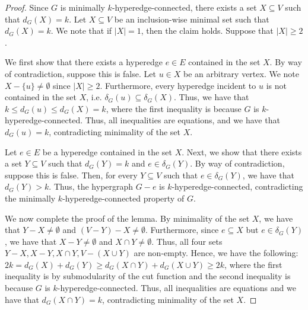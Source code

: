 \begin{proof}
    Since $G$ is minimally $k$-hyperedge-connected, there exists a set $X \subseteq V$ such that $d_G(X) = k$. Let $X\subseteq V$ be an inclusion-wise minimal set such that $d_G(X)=k$. We note that if $|X| = 1$, then the claim holds. Suppose that $|X| \geq 2$.

    We first show that there exists a hyperedge $e\in E$ contained in the set $X$. By way of contradiction, suppose this is false. Let $u \in X$ be an arbitrary vertex. We note $X - \{u\} \not = \emptyset$ since $|X| \geq 2$. Furthermore, every hyperedge incident to $u$ is not contained in the set $X$, i.e. $\delta_G(u) \subseteq \delta_G(X)$. Thus, we have that $k \leq d_G(u) \leq d_G(X) = k$, where the first inequality is because $G$ is $k$-hyperedge-connected. Thus, all inequalities are equations, and we have that $d_G(u) = k$, contradicting minimality of the set $X$.

    Let $e\in E$ be a hyperedge contained in the set $X$. 
    Next, we show that %
    there exists a set $Y \subseteq V$ such that $d_G(Y) = k$ and $e \in \delta_G(Y)$. 
    By way of contradiction, suppose this is false. Then, for every $Y \subseteq V$ such that $e \in \delta_G(Y)$, we have that $d_G(Y) > k$. Thus, the hypergraph $G - e$ is $k$-hyperedge-connected, contradicting the minimally $k$-hyperedge-connected property of $G$.

    We now complete the proof of the lemma. By minimality of the set $X$, we have that $Y-X\neq \emptyset$ and $(V-Y)-X\neq \emptyset$. 
    Furthermore, since $e \subseteq X$ but $e \in \delta_G(Y)$, we have that $X-Y \not = \emptyset$ 
    and $X \cap Y \not = \emptyset$. 
    Thus, all four sets $Y-X, X-Y, X\cap Y, V-(X\cup Y)$ are non-empty.
    Hence, we have the following: $2k = d_{G}(X) + d_G(Y) \geq d_G(X\cap Y) + d_G(X\cup Y) \geq 2k$, where the first inequality is by submodularity of the cut function and the second inequality is because $G$ is $k$-hyperedge-connected. 
    Thus, all inequalities are equations and we have that $d_{G}(X\cap Y) = k$, contradicting minimality of the set $X$.
\end{proof}


